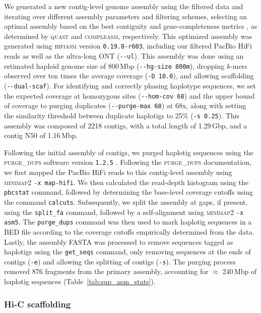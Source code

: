 We generated a new contig-level genome assembly using the filtered data and iterating over
different assembly parameters and filtering schemes,
selecting an optimal assembly based on the best contiguity and gene-completeness
metrics \citep{rayamajhi_evaluating_2022}, as determined by \textsc{quast} and
\textsc{compleasm}, respectively.
This optimized assembly was generated using \textsc{hifiasm} version \texttt{0.19.8-r603},
including our filtered PacBio HiFi reads as well as the ultra-long ONT
(\texttt{-{}-ul}).
This assembly was done using an estimated haploid genome size of 800\,Mbp
(\texttt{-{}-hg-size 800m}), dropping $k$-mers observed over ten times the average coverage
(\texttt{-D 10.0}), and allowing scaffolding (\texttt{-{}-dual-scaf}).
For identifying and correctly phasing haplotype sequences, we set the expected coverage
at homozygous sites (\texttt{-{}-hom-cov 68}) and the upper bound of coverage to purging
duplicates (\texttt{-{}-purge-max 68}) at 68x, along with setting the similarity threshold
between duplicate haplotigs to 25\% (\texttt{-s 0.25}).
This assembly was composed of \num{2218} contigs, with a total length of 1.29\,Gbp, and a contig
N50 of 1.16\,Mbp.
\vspace{0.1cm}

Following the initial assembly of contigs, we purged haplotig sequences using the
\textsc{purge\_dups} software version \texttt{1.2.5} \citep{guan_identifying_2020}.
Following the \textsc{purge\_dups} documentation, we first mapped the PacBio HiFi
reads to this contig-level assembly using \textsc{minimap2} \texttt{-x map-hifi}.
We then calculated the read-depth histogram using the \texttt{pbcstat} command,
followed by determining the base-level coverage cutoffs using the command
\texttt{calcuts}. Subsequently, we split the assembly at gaps, if present, using
the \texttt{split\_fa} command, followed by a self-alignment using \textsc{minimap2}
\texttt{-x asm5}. The \texttt{purge\_dups} command was then used to mark haplotig
sequences in a BED file according to the coverage cutoffs empirically determined
from the data. Lastly, the assembly FASTA was processed to remove sequences tagged
as haplotigs using the \texttt{get\_seqs} command, only removing sequences at the
ends of contigs (\texttt{-e}) and allowing the splitting of contigs (\texttt{-s}).
The purging process removed 876 fragments from the primary assembly, accounting for
$\approx$ 240\,Mbp of haplotig sequences (Table~\ref{tab:sup_asm_stats}).

\subsubsection*{Hi-C scaffolding}

